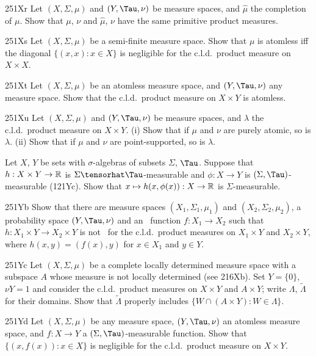 {\spheader 251Xr Let $(X,\Sigma,\mu)$ and $(Y,\Tau,\nu)$ be
measure spaces, and $\hat\mu$ the completion of $\mu$.
Show that $\mu$, $\nu$ and $\hat\mu$, $\nu$ have the same primitive
product measures.

\spheader 251Xs Let $(X,\Sigma,\mu)$ be a semi-finite measure space.
Show that $\mu$ is atomless iff the diagonal $\{(x,x):x\in X\}$ is
negligible for the c.l.d.\ product measure on $X\times X$.

\spheader 251Xt Let $(X,\Sigma,\mu)$ be an atomless measure
space, and $(Y,\Tau,\nu)$ any measure space.   Show that the c.l.d.\
product measure on $X\times Y$ is atomless.

\sqheader 251Xu Let $(X,\Sigma,\mu)$ and $(Y,\Tau,\nu)$ be measure
spaces, and $\lambda$ the c.l.d.\ product measure on $X\times Y$.
(i) Show that if $\mu$ and $\nu$ are purely atomic, so is $\lambda$.
(ii) Show that if $\mu$ and $\nu$ are point-supported, so is $\lambda$.

Let $X$, $Y$ be sets with $\sigma$-algebras of subsets $\Sigma$, $\Tau$.
Suppose that $h:X\times Y\to\Bbb R$ is $\Sigma\tensorhat\Tau$-measurable
and $\phi:X\to Y$ is $(\Sigma,\Tau)$-measurable (121Yc).   Show that
$x\mapsto h(x,\phi(x)):X\to\Bbb R$ is $\Sigma$-measurable.

\spheader 251Yb Show that there are
measure spaces $(X_1,\Sigma_1,\mu_1)$ and $(X_2,\Sigma_2,\mu_2)$,
a probability space $(Y,\Tau,\nu)$ and an \imp\ function $f:X_1\to X_2$
such that $h:X_1\times Y\to X_2\times Y$ is not \imp\ for the c.l.d.\
product measures on $X_1\times Y$ and $X_2\times Y$, where
$h(x,y)=(f(x),y)$ for $x\in X_1$ and $y\in Y$.

\spheader 251Yc Let $(X,\Sigma,\mu)$ be a complete
locally determined measure space with a subspace $A$ whose measure is
not locally determined (see 216Xb).      Set $Y=\{0\}$, $\nu Y=1$ and
consider the c.l.d.\ product measures on $X\times Y$ and $A\times Y$;
write $\Lambda$, $\tilde\Lambda$ for their domains.   Show that
$\tilde\Lambda$ properly includes $\{W\cap(A\times Y):W\in\Lambda\}$.

\spheader 251Yd Let $(X,\Sigma,\mu)$ be any measure space,
$(Y,\Tau,\nu)$ an atomless measure space, and $f:X\to Y$ a
$(\Sigma,\Tau)$-measurable function.   Show that $\{(x,f(x)):x\in X\}$
is negligible for the c.l.d.\ product measure on $X\times Y$.
}%

